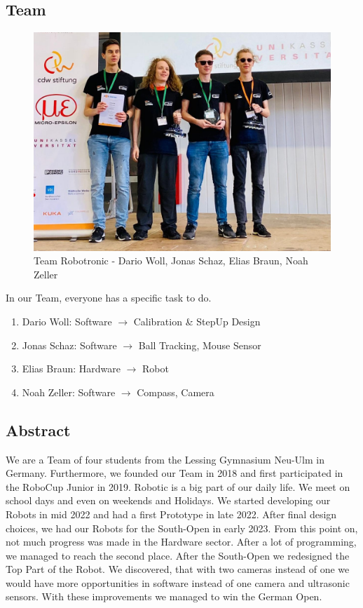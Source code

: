 \subsection{Team}
\begin{figure}[h]
    \centering
    \includegraphics[width=\textwidth]{img/Robotronic.jpg}
    \caption{Team Robotronic - Dario Woll, Jonas Schaz, Elias Braun, Noah Zeller}
    \label{fig:team}
\end{figure}
In our Team, everyone has a specific task to do.
\begin{enumerate}
    \item{Dario Woll: Software $\rightarrow$ Calibration \& StepUp Design}
    \item{Jonas Schaz: Software  $\rightarrow$ Ball Tracking, Mouse Sensor}
    \item{Elias Braun: Hardware $\rightarrow$ Robot}
    \item{Noah Zeller: Software $\rightarrow$ Compass, Camera}
\end{enumerate}
\newpage

\subsection{Abstract}
We are a Team of four students from the Lessing Gymnasium Neu-Ulm in Germany. Furthermore, we founded our Team
in 2018 and first participated in the RoboCup Junior in 2019. Robotic is a big part of our daily life.
We meet on school days and even on weekends and Holidays.
\newline
\newline
We started developing our Robots in mid 2022 and had a first Prototype in late 2022. After final design
choices, we had our Robots for the South-Open in early 2023. From this point on, not much progress was
made in the Hardware sector.
After a lot of programming, we managed to reach the second place.
\newline
After the South-Open we redesigned the Top Part of the Robot. We discovered, that with two cameras
instead of one we would have more opportunities in software instead of one camera and ultrasonic sensors.
With these improvements we managed to win the German Open.